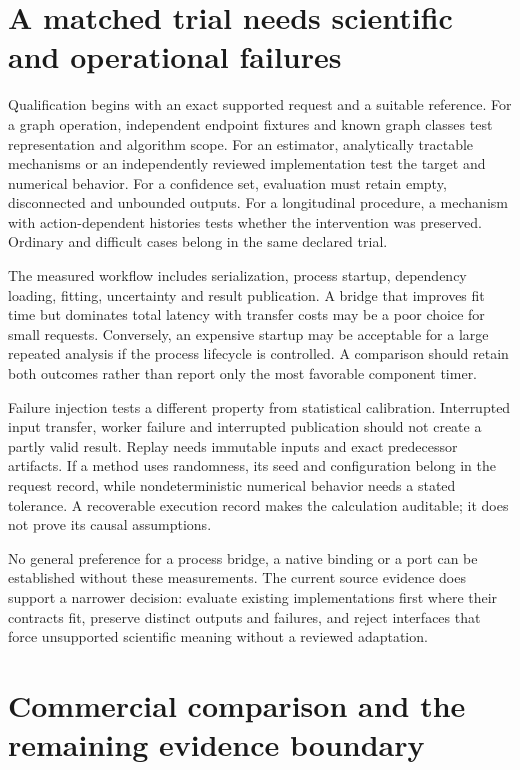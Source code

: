 \section{A matched trial needs scientific and operational failures}

Qualification begins with an exact supported request and a suitable reference.
For a graph operation, independent endpoint fixtures and known graph classes
test representation and algorithm scope. For an estimator, analytically
tractable mechanisms or an independently reviewed implementation test the
target and numerical behavior. For a confidence set, evaluation must retain
empty, disconnected and unbounded outputs. For a longitudinal procedure, a
mechanism with action-dependent histories tests whether the intervention was
preserved. Ordinary and difficult cases belong in the same declared trial.

The measured workflow includes serialization, process startup, dependency
loading, fitting, uncertainty and result publication. A bridge that improves
fit time but dominates total latency with transfer costs may be a poor choice
for small requests. Conversely, an expensive startup may be acceptable for a
large repeated analysis if the process lifecycle is controlled. A comparison
should retain both outcomes rather than report only the most favorable
component timer.

Failure injection tests a different property from statistical calibration.
Interrupted input transfer, worker failure and interrupted publication should
not create a partly valid result. Replay needs immutable inputs and exact
predecessor artifacts. If a method uses randomness, its seed and configuration
belong in the request record, while nondeterministic numerical behavior needs
a stated tolerance. A recoverable execution record makes the calculation
auditable; it does not prove its causal assumptions.

No general preference for a process bridge, a native binding or a port can
be established without these measurements. The current source evidence does
support a narrower decision: evaluate existing implementations first where
their contracts fit, preserve distinct outputs and failures, and reject
interfaces that force unsupported scientific meaning without a reviewed
adaptation.

\section{Commercial comparison and the remaining evidence boundary}

